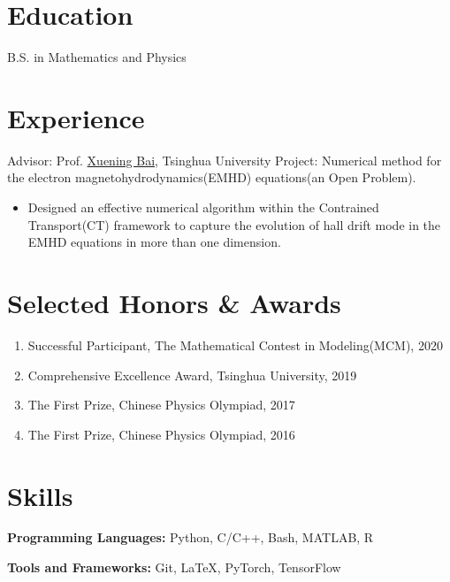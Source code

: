 \documentclass{resume}
\begin{document}



\section{Education}
B.S. in Mathematics and Physics

\section{Experience}
Advisor: Prof. \href{http://astro.tsinghua.edu.cn/~xbai/}{Xuening Bai}, Tsinghua University
Project: Numerical method for the electron magnetohydrodynamics(EMHD) equations(an Open Problem).
\begin{itemize}
    \item Designed an effective numerical algorithm within the Contrained Transport(CT) framework to capture the evolution of hall drift mode in the EMHD equations in more
    than one dimension.
\end{itemize}





\section{Selected Honors \& Awards}
\begin{enumerate}
    \item Successful Participant, The Mathematical Contest in Modeling(MCM), 2020
    \item Comprehensive Excellence Award, Tsinghua University, 2019
    \item The First Prize, Chinese Physics Olympiad, 2017
    \item The First Prize, Chinese Physics Olympiad, 2016
\end{enumerate}

\section{Skills}
\textbf{Programming Languages:} \small Python, C/C++, Bash, MATLAB, R

\textbf{Tools and Frameworks:} \small Git, \LaTeX, PyTorch, TensorFlow
\end{document}
